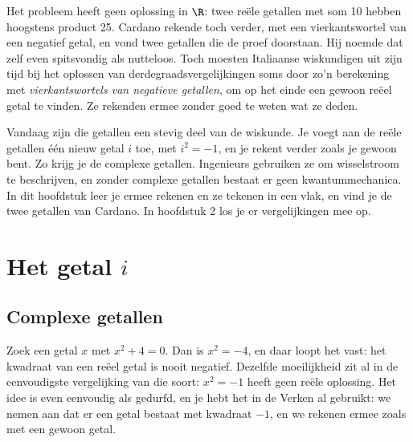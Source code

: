 Het probleem heeft geen oplossing in $\R$: twee reële getallen met som 10 hebben hoogstens product 25. Cardano rekende toch verder, met een vierkantswortel van een negatief getal, en vond twee getallen die de proef doorstaan. Hij noemde dat zelf even spitsvondig als nutteloos. Toch moesten Italiaanse wiskundigen uit zijn tijd bij het oplossen van derdegraadsvergelijkingen soms door zo'n berekening met \textit{vierkantswortels van negatieve getallen}, om op het einde een gewoon reëel getal te vinden. Ze rekenden ermee zonder goed te weten wat ze deden.

Vandaag zijn die getallen een stevig deel van de wiskunde. Je voegt aan de reële getallen één nieuw getal $i$ toe, met $i^2 = -1$, en je rekent verder zoals je gewoon bent. Zo krijg je de complexe getallen. Ingenieurs gebruiken ze om wisselstroom te beschrijven, en zonder complexe getallen bestaat er geen kwantummechanica. In dit hoofdstuk leer je ermee rekenen en ze tekenen in een vlak, en vind je de twee getallen van Cardano. In hoofdstuk 2 los je er vergelijkingen mee op.

\begin{oefeningen}[Start]

\end{oefeningen}


\section{Het getal \texorpdfstring{$i$}{i}}

\subsection{Complexe getallen}

Zoek een getal $x$ met $x^2 + 4 = 0$. Dan is $x^2 = -4$, en daar loopt het vast: het kwadraat van een reëel getal is nooit negatief. Dezelfde moeilijkheid zit al in de eenvoudigste vergelijking van die soort: $x^2 = -1$ heeft geen reële oplossing. Het idee is even eenvoudig als gedurfd, en je hebt het in de Verken al gebruikt: we nemen aan dat er een getal bestaat met kwadraat $-1$, en we rekenen ermee zoals met een gewoon getal.

